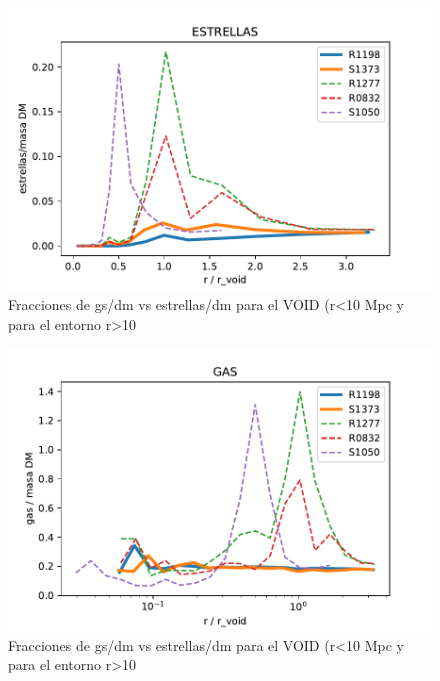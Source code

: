 \begin{figure}[h]
\centering
\includegraphics[width=18cm]{Figures/ESTRELLAS.pdf}
\decoRule
\caption[Fraccione stellar vs gas]{Fracciones de gs/dm vs estrellas/dm para el VOID (r<10 Mpc y para el entorno r>10}
\label{fig:Electron}
\end{figure}

\begin{figure}[h]
\centering
\includegraphics[width=18cm]{Figures/GAS.pdf}
\decoRule
\caption[Fraccione stellar vs gas]{Fracciones de gs/dm vs estrellas/dm para el VOID (r<10 Mpc y para el entorno r>10}
\label{fig:Electron}
\end{figure}

